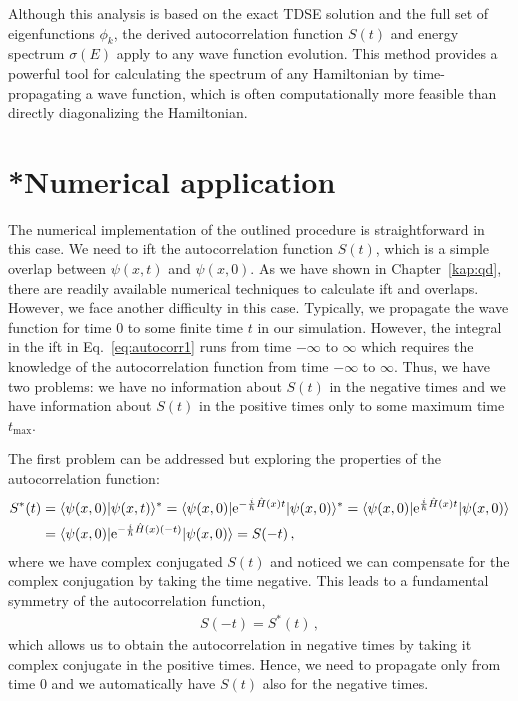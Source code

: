 Although this analysis is based on the exact TDSE solution and the full set of eigenfunctions $\phi_k$, the derived autocorrelation function $S(t)$ and energy spectrum $\sigma(E)$ apply to any wave function evolution. This method provides a powerful tool for calculating the spectrum of any Hamiltonian by time-propagating a wave function, which is often computationally more feasible than directly diagonalizing the Hamiltonian.

\section{*Numerical application}
\label{sec:autocorr_numap}

The numerical implementation of the outlined procedure is straightforward in this case. We need to \acrlong{ift} the autocorrelation function $S(t)$, which is a simple overlap between $\psi(x,t)$ and $\psi(x,0)$. As we have shown in Chapter~\ref{kap:qd}, there are readily available numerical techniques to calculate \acrlong{ift} and overlaps. However, we face another difficulty in this case. Typically, we propagate the wave function for time 0 to some finite time $t$ in our simulation. However, the integral in the \acrlong{ift} in Eq.~\eqref{eq:autocorr1} runs from time $-\infty$ to $\infty$ which requires the knowledge of the autocorrelation function from time $-\infty$ to $\infty$. Thus, we have two problems: we have no information about $S(t)$ in the negative times and we have information about $S(t)$ in the positive times only to some maximum time $t_\mathrm{max}$.

The first problem can be addressed but exploring the properties of the autocorrelation function:
\begin{align}
    S^*(t) &= \langle \psi(x,0) | \psi(x,t) \rangle^* = \langle \psi(x,0) | \mathrm{e}^{-\frac{i}{\hbar}\hat{H}(x)t} |\psi(x,0) \rangle^* = \langle \psi(x,0) | \mathrm{e}^{\frac{i}{\hbar}\hat{H}(x)t} |\psi(x,0) \rangle \notag \\
    &= \langle \psi(x,0) | \mathrm{e}^{-\frac{i}{\hbar}\hat{H}(x)(-t)} |\psi(x,0) \rangle = S(-t) \, ,
    \label{eq:autocorrsym2}
\end{align}
where we have complex conjugated $S(t)$ and noticed we can compensate for the complex conjugation by taking the time negative. This leads to a fundamental symmetry of the autocorrelation function,
\begin{align}
    S(-t) = S^*(t) \, ,
    \label{eq:autocorrsym1}
\end{align}
which allows us to obtain the autocorrelation in negative times by taking it complex conjugate in the positive times. Hence, we need to propagate only from time 0 and we automatically have $S(t)$ also for the negative times. 


